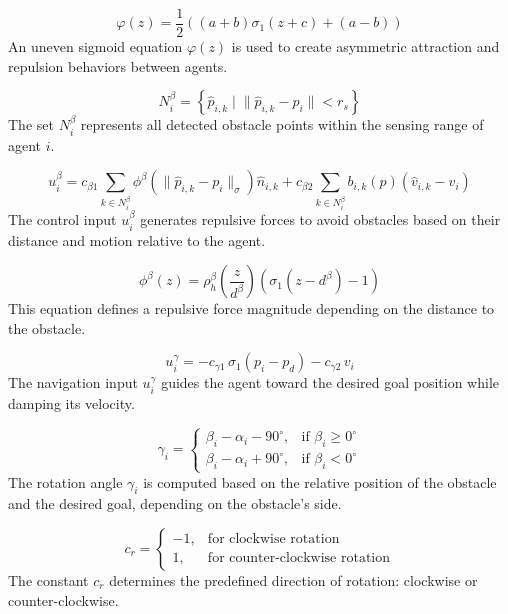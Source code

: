 \documentclass[conference]{IEEEtran}
\begin{document}
\begin{equation}
\varphi(z) = \frac{1}{2} \left( (a + b) \sigma_1(z + c) + (a - b) \right)
\label{eq:21}
\end{equation}
An uneven sigmoid equation $\varphi(z)$ is used to create asymmetric attraction and repulsion behaviors between agents.

\begin{equation}
N^{\beta}_i = \left\{ \hat{p}_{i,k} \;\big|\; \| \hat{p}_{i,k} - p_i \| < r_s \right\}
\label{eq:22}
\end{equation}
The set $N^{\beta}_i$ represents all detected obstacle points within the sensing range of agent $i$.

\begin{equation}
u^{\beta}_i = c_{\beta 1} \sum_{k \in N^{\beta}_i} \phi^{\beta} \left( \| \hat{p}_{i,k} - p_i \|_{\sigma} \right) \hat{n}_{i,k}
+ c_{\beta 2} \sum_{k \in N^{\beta}_i} b_{i,k}(p) (\hat{v}_{i,k} - v_i)
\label{eq:23}
\end{equation}
The control input $u^{\beta}_i$ generates repulsive forces to avoid obstacles based on their distance and motion relative to the agent.

\begin{equation}
\phi^{\beta}(z) = \rho^{\beta}_h \left( \frac{z}{d^{\beta}} \right) \left( \sigma_1(z - d^{\beta}) - 1 \right)
\label{eq:24}
\end{equation}
This equation defines a repulsive force magnitude depending on the distance to the obstacle.

\begin{equation}
u^{\gamma}_i = -c_{\gamma 1} \, \sigma_1(p_i - p_d) - c_{\gamma 2} \, v_i
\label{eq:25}
\end{equation}
The navigation input $u^{\gamma}_i$ guides the agent toward the desired goal position while damping its velocity.

\begin{equation}
\gamma_i =
\begin{cases}
\beta_i - \alpha_i - 90^\circ, & \text{if } \beta_i \geq 0^\circ \\
\beta_i - \alpha_i + 90^\circ, & \text{if } \beta_i < 0^\circ
\end{cases}
\label{eq:26}
\end{equation}
The rotation angle $\gamma_i$ is computed based on the relative position of the obstacle and the desired goal, depending on the obstacle’s side.

\begin{equation}
c_r =
\begin{cases}
-1, & \text{for clockwise rotation} \\
1,  & \text{for counter-clockwise rotation}
\end{cases}
\label{eq:27}
\end{equation}
The constant $c_r$ determines the predefined direction of rotation: clockwise or counter-clockwise.
\end{document}
